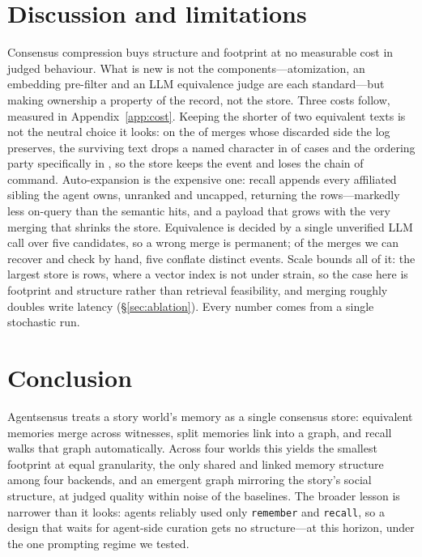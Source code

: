 \documentclass{article}
\newcommand{\code}[1]{\texttt{\small #1}}
\begin{document}
\section{Discussion and limitations}
\label{sec:discussion}
Consensus compression buys structure and footprint at no measurable cost in
judged behaviour. What is new is not the components---atomization, an embedding
pre-filter and an LLM equivalence judge are each standard---but making ownership
a property of the record, not the store. Three costs follow, measured
in Appendix~\ref{app:cost}. Keeping the shorter of two equivalent texts is not the
neutral choice it looks: on the \MergeCov{} of merges whose discarded side the
log preserves, the surviving text drops a named character in \MergeLossPct{} of
cases and the ordering party specifically in \MergePrincPct{}, so the store
keeps the event and loses the chain of command.
Auto-expansion is the expensive one: recall appends every affiliated sibling the
agent owns, unranked and uncapped, returning \ExpAmpRange{} the rows---markedly
less on-query than the semantic hits, and a payload that grows with the very
merging that shrinks the store. Equivalence is decided by a single
unverified LLM call over five candidates, so a wrong merge is permanent; of the
\MergeRecov{} merges we can recover and check by hand, five conflate distinct
events.
Scale bounds all of it: the largest store is \StoreRowsMax{} rows, where a
vector index is not under strain, so the case here is footprint and
structure rather than retrieval feasibility, and merging roughly doubles write
latency (\S\ref{sec:ablation}). Every number comes from a single stochastic run.

\section{Conclusion}
Agentsensus treats a story world's memory as a single consensus store: equivalent
memories merge across witnesses, split memories link into a graph, and recall
walks that graph automatically. Across four worlds this yields the smallest
footprint at equal granularity, the only shared and linked memory structure
among four backends, and an emergent graph mirroring the story's social
structure, at judged quality within noise of the baselines. The broader lesson is narrower than it looks: agents
reliably used only \code{remember} and \code{recall}, so a design that waits for
agent-side curation gets no structure---at this horizon, under the one
prompting regime we tested.
\end{document}

